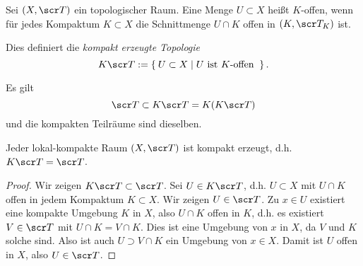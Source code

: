 \begin{df}
	Sei $(X, \scr T)$ ein topologischer Raum.
	Eine Menge $U \subset X$ heißt $K$-offen, wenn für jedes Kompaktum $K \subset X$ die Schnittmenge $U \cap K$ offen in $(K, \scr T_K)$ ist.

	Dies definiert die \emph{kompakt erzeugte Topologie}
	\[
		K \scr T :=
		\Set{ U \subset X | U \text{ ist $K$-offen } }.
	\]
\end{df}

\begin{lem}
	Es gilt
	\[
		\scr T \subset K \scr T = K(K \scr T)
	\]
	und die kompakten Teilräume sind dieselben.
\end{lem}

\begin{st}
	Jeder lokal-kompakte Raum $(X, \scr T)$ ist kompakt erzeugt, d.h. $K \scr T = \scr T$.
	\begin{proof}
		Wir zeigen $K \scr T \subset \scr T$.
		Sei $U \in K \scr T$, d.h. $U \subset X$ mit $U \cap K$ offen in jedem Kompaktum $K \subset X$.
		Wir zeigen $U \in \scr T$.
		Zu $x \in U$ existiert eine kompakte Umgebung $K$ in $X$, also $U \cap K$ offen in $K$, d.h. es existiert $V \in \scr T$ mit $U \cap K = V \cap K$.
		Dies ist eine Umgebung von $x$ in $X$, da $V$ und $K$ solche sind.
		Also ist auch $U \supset V \cap K$ ein Umgebung von $x \in X$.
		Damit ist $U$ offen in $X$, also $U \in \scr T$.
	\end{proof}
\end{st}
